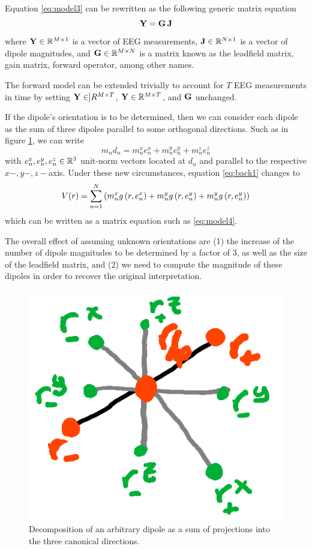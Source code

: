 Equation \eqref{eq:model3} can be rewritten as the following generic matrix equation
\begin{equation}
\mathbf{Y} = \mathbf{G}\, \mathbf{J}
\label{eq:model4}
\end{equation}
where $\mathbf{Y} \in \mathbb{R}^{M\times 1}$ is a vector of EEG measurements, $\mathbf{J} \in \mathbb{R}^{N\times 1}$ is a vector of dipole magnitudes, and $\mathbf{G} \in \mathbb{R}^{M\times N}$ is a matrix known as the leadfield matrix, gain matrix, forward operator, among other names.

The forward model can be extended trivially to account for $T$ EEG measurements in time by setting $\mathbf{Y} \in ]R^{M\times T}$, $\mathbf{Y} \in \mathbb{R}^{M\times T}$, and $\mathbf{G}$ unchanged.


If the dipole's orientation is to be determined, then we can consider each dipole as the sum of three dipoles parallel to some orthogonal directions. Such as in figure \ref{fig:diagrams3}, we can write
\begin{equation}
m_n d_n = m_n^x e_n^x + m_n^y e_n^y + m_n^z e_n^z
\end{equation}
with $e_n^x, e_n^y, e_n^z \in \mathbb{R}^3$ unit-norm vectors located at $d_n$ and parallel to the respective $x-, y-, z-$axis.
%
Under these new circumstances, equation \eqref{eq:back1} changes to
\begin{equation}
V(r) = 
\sum_{n=1}^N \left( m_n^x g\left( r, e_n^x \right) + m_n^y g\left( r, e_n^y \right) + m_n^y g\left( r, e_n^y \right)
 \right)
\end{equation}
which can be written as a matrix equation such as \eqref{eq:model4}.

The overall effect of assuming unknown orientations are (1) the increase of the number of dipole magnitudes to be determined by a factor of 3, as well as the size of the leadfield matrix, and (2)
we need to compute the magnitude of these dipoles in order to recover the original interpretation.

\begin{figure}
\centering
\includegraphics[width=0.4\linewidth]{./img_dev/nsOrthDecomp}
\caption{Decomposition of an arbitrary dipole as a sum of projections into the three canonical directions.}
\label{fig:diagrams3}
\end{figure}

